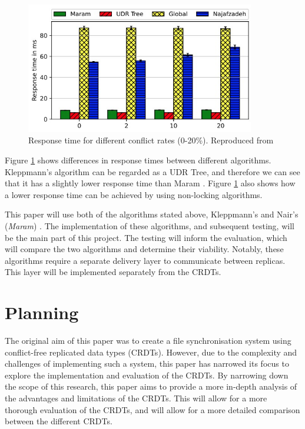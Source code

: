 \documentclass[12pt]{report}
\begin{document}
\begin{figure}[H]
    \centering
    \includegraphics[width=10cm]{images/Response.jpg}
    \caption{Response time for different conflict rates (0-20\%). Reproduced from \cite{https://doi.org/10.48550/arxiv.2103.04828}}
    \label{fig:responsetime}
\end{figure}

Figure \ref{fig:responsetime} shows differences in response times between different algorithms. Kleppmann's algorithm \cite{9563274} can be regarded as a UDR Tree, and therefore we can see that it has a slightly lower response time than Maram \cite{https://doi.org/10.48550/arxiv.2103.04828}. Figure \ref{fig:responsetime} also shows how a lower response time can be achieved by using non-locking algorithms.


This paper will use both of the algorithms stated above, Kleppmann's \cite{9563274} and Nair's (\textit{Maram}) \cite{https://doi.org/10.48550/arxiv.2103.04828}. The implementation of these algorithms, and subsequent testing, will be the main part of this project. The testing will inform the evaluation, which will compare the two algorithms and determine their viability. Notably, these algorithms require a separate delivery layer to communicate between replicas. This layer will be implemented separately from the CRDTs.


\newpage
\chapter{Planning}
The original aim of this paper was to create a file synchronisation system using conflict-free replicated data types (CRDTs). However, due to the complexity and challenges of implementing such a system, this paper has narrowed its focus to explore the implementation and evaluation of the CRDTs. By narrowing down the scope of this research, this paper aims to provide a more in-depth analysis of the advantages and limitations of the CRDTs. This will allow for a more thorough evaluation of the CRDTs, and will allow for a more detailed comparison between the different CRDTs.
\end{document}
